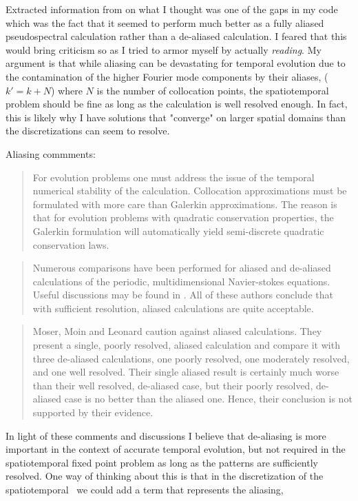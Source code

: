 Extracted information from  on what I thought was one of the gaps in my code
which was the fact that it seemed to perform much better as a fully aliased pseudospectral
calculation rather than a de-aliased calculation. I feared that this would bring criticism
so as I tried to armor myself by actually \emph{reading}. My argument is that while aliasing
can be devastating for temporal evolution due to the contamination of the higher Fourier
mode components by their aliases, ($k' = k + N$) where $N$ is the number of collocation
points, the spatiotemporal problem should be fine as long as the calculation is well
resolved enough. In fact, this is likely why I have solutions that "converge" on larger
spatial domains than the discretizations can seem to resolve.

Aliasing commments:
\begin{quote}
For evolution problems  one must address the issue of the temporal numerical
stability of the calculation. Collocation approximations must be formulated
with more care than Galerkin approximations. The reason is that for evolution
problems with quadratic conservation properties, the Galerkin formulation
will automatically yield semi-discrete quadratic conservation laws.
\end{quote}

\begin{quote}
Numerous comparisons have been performed for aliased and de-aliased
calculations of the periodic, multidimensional Navier-stokes equations.
Useful discussions may be found in
.  All of these authors conclude
that with sufficient resolution, aliased calculations are quite acceptable.
\end{quote}


\begin{quote}
Moser, Moin and Leonard caution against aliased calculations.
They present a single, poorly resolved, aliased calculation and compare it with three
de-aliased calculations, one poorly resolved, one moderately resolved, and one well
resolved. Their single aliased result is certainly much worse than their well resolved,
de-aliased case, but their poorly resolved, de-aliased case is no better than the aliased
one. Hence, their conclusion is not supported by their evidence.
\end{quote}

In light of these comments and discussions I believe that de-aliasing is more
important in the context of accurate temporal evolution, but not required in
the spatiotemporal fixed point problem as long as the patterns are
sufficiently resolved. One way of thinking about this is that in the
discretization of the spatiotemporal \KSe\ we could add a term that
represents the aliasing,

